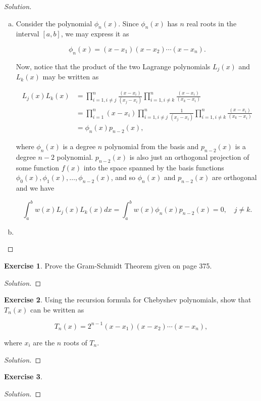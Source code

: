 \documentclass[12pt,a4]{article}
\theoremstyle{definition}
\newtheorem{exercise}{Exercise}
\begin{document}
\begin{proof}[Solution]
	\begin{enumerate}[(a)]
		\item Consider the polynomial $\phi_n(x)$. Since $\phi_n(x)$ has $n$ real roots in the interval $[a, b]$, we may express it as 
		
		\[
		\phi_n(x) = (x - x_1) (x - x_2) \cdots (x - x_n) {.}
		\]
		
		\noindent Now, notice that the product of the two Lagrange polynomials $L_j(x)$ and $L_k(x)$ may be written as 
		
		\begin{align*}
		L_j(x) L_k(x) &= \prod_{i = 1, i \neq j}^n \frac{(x - x_i)}{(x_j - x_i)} \prod_{i = 1, i \neq k}^n \frac{(x - x_i)}{(x_k - x_i)} \\
		 &= \prod_{i = 1}^n (x - x_i) \prod_{i = 1, i \neq j}^n \frac{1}{(x_j - x_i)} \prod_{i = 1, i \neq k}^n \frac{(x - x_i)}{(x_k - x_i)} \\
		 &= \phi_n(x) p_{n - 2}(x) {,}
		\end{align*}
		
		\noindent where $\phi_n(x)$ is a degree $n$ polynomial from the basis and $p_{n - 2}(x)$ is a degree $n - 2$ polynomial. $p_{n - 2}(x)$ is also just an orthogonal projection of some function $f(x)$ into the space spanned by the basis functions $\phi_0(x), \phi_1(x), \ldots, \phi_{n - 2}(x)$, and so $\phi_n(x)$ and $p_{n - 2}(x)$ are orthogonal and we have
		
		\[
		\int_a^b w(x) L_j(x) L_k(x) dx = \int_a^b w(x) \phi_n(x) p_{n - 2}(x) = 0 {,} \quad j \neq k {.}
		\]
		
		\item 
	\end{enumerate}
\end{proof}

\begin{exercise}
	Prove the Gram-Schmidt Theorem given on page 375. 
\end{exercise}
\begin{proof}[Solution]
	
\end{proof}

\begin{exercise}
	Using the recursion formula for Chebyshev polynomials, show that $T_n(x)$ can be written as
	
	\[
	T_n(x) = 2^{n - 1} (x - x_1) (x - x_2) \cdots (x - x_n) {,}
	\]
	
	\noindent where $x_i$ are the $n$ roots of $T_n$. 
\end{exercise}
\begin{proof}[Solution]
	
\end{proof}

\begin{exercise}
	
\end{exercise}
\begin{proof}[Solution]
	
\end{proof}
\end{document}
